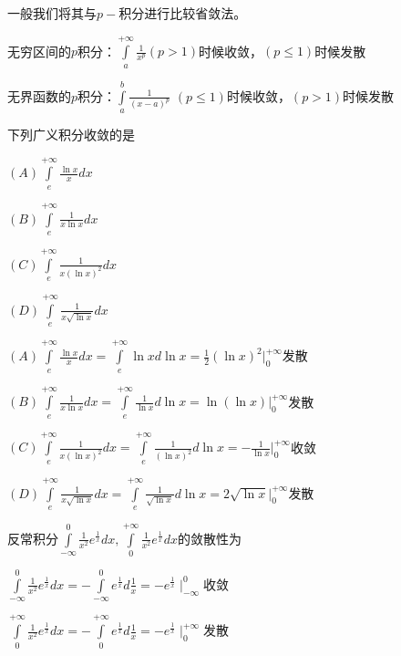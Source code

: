 \documentclass[lang=cn,10pt]{elegantbook}
\begin{document}
一般我们将其与$p-$积分进行比较省敛法。
\begin{conclusion}
	无穷区间的$p$积分：$\int\limits_a^{+\infty}{\frac{1}{x^p}}$$(p>1)$时候收敛，$(p\le1)$时候发散
	
	无界函数的$p$积分：$\int\limits_a^b{\frac{1}{\left( x-a \right) ^p}}$
	$(p\le 1)$时候收敛，$(p>1)$时候发散
\end{conclusion}
\begin{example}
	下列广义积分收敛的是
	
	$(A)\int\limits_e^{+\infty}{\frac{\ln x}{x}dx}$
	
	$(B)\int\limits_e^{+\infty}{\frac{1}{x\ln x}dx}$
	
	$(C)\int\limits_e^{+\infty}{\frac{1}{x\left( \ln x \right) ^2}dx}$
	
	$(D)\int\limits_e^{+\infty}{\frac{1}{x\sqrt{\ln x}}dx}$
\end{example}
\begin{solution}
	
	$(A)\int\limits_e^{+\infty}{\frac{\ln x}{x}dx}=\int\limits_e^{+\infty}{\ln xd\ln x=\frac{1}{2}\left( \ln x \right) ^2|_{0}^{+\infty}}$发散
	
	$(B)\int\limits_e^{+\infty}{\frac{1}{x\ln x}dx}=\int\limits_e^{+\infty}{\frac{1}{\ln x}d\ln x=\ln \left( \ln x \right) |_{0}^{+\infty}}$发散
	
	$(C)\int\limits_e^{+\infty}{\frac{1}{x\left( \ln x \right) ^2}dx}=\int\limits_e^{+\infty}{\frac{1}{\left( \ln x \right) ^2}d\ln x=-\frac{1}{\ln x}|_{0}^{+\infty}}$收敛
	
	$(D)\int\limits_e^{+\infty}{\frac{1}{x\sqrt{\ln x}}dx}=\int\limits_e^{+\infty}{\frac{1}{\sqrt{\ln x}^{}}d\ln x=2\sqrt{\ln x}|_{0}^{+\infty}}$发散
	
\end{solution}
\begin{example}
	反常积分$\int\limits_{-\infty}^0{\frac{1}{x^2}e^{\frac{1}{x}}dx},\int\limits_0^{+\infty}{\frac{1}{x^2}e^{\frac{1}{x}}dx}$的敛散性为
\end{example}
\begin{solution}
	
	$\int\limits_{-\infty}^0{\frac{1}{x^2}e^{\frac{1}{x}}dx}=-\int\limits_{-\infty}^0{e^{\frac{1}{x}}d\frac{1}{x}=-e^{\frac{1}{x}}\mid_{-\infty}^{0}}
	$收敛
	
	$\int\limits_0^{+\infty}{\frac{1}{x^2}e^{\frac{1}{x}}dx}=-\int\limits_0^{+\infty}{e^{\frac{1}{x}}d\frac{1}{x}=-e^{\frac{1}{x}}\mid_{0}^{+\infty}}$发散
	
	
\end{solution}
\end{document}
